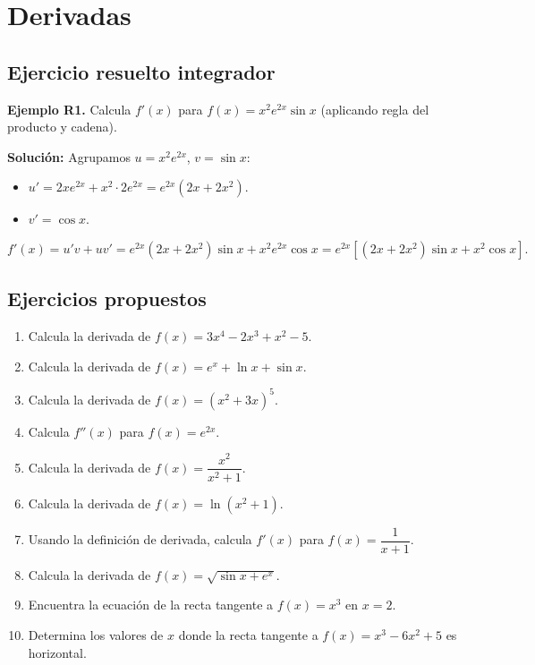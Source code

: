 \documentclass[12pt, a4paper]{article}
\begin{document}
\newpage

\section{Derivadas}

\subsection{Ejercicio resuelto integrador}

\textbf{Ejemplo R1.} Calcula $f'(x)$ para $f(x) = x^2 e^{2x} \sin x$ (aplicando regla del producto y cadena).

\begin{cuadrosolucion}
  \textbf{Solución:} Agrupamos $u = x^2 e^{2x}$, $v = \sin x$:
  \begin{itemize}
    \item $u' = 2x e^{2x} + x^2 \cdot 2e^{2x} = e^{2x}(2x + 2x^2)$.
    \item $v' = \cos x$.
  \end{itemize}
  $$f'(x) = u'v + uv' = e^{2x}(2x + 2x^2)\sin x + x^2 e^{2x} \cos x = e^{2x}\left[(2x + 2x^2)\sin x + x^2 \cos x\right].$$
\end{cuadrosolucion}

\subsection{Ejercicios propuestos}

\begin{enumerate}[leftmargin=*, resume]
  \item \facil{} Calcula la derivada de $f(x) = 3x^4 - 2x^3 + x^2 - 5$.

  \item \facil{} Calcula la derivada de $f(x) = e^x + \ln x + \sin x$.

  \item \facil{} Calcula la derivada de $f(x) = (x^2 + 3x)^5$.

  \item \facil{} Calcula $f''(x)$ para $f(x) = e^{2x}$.

  \item \medio{} Calcula la derivada de $f(x) = \dfrac{x^2}{x^2 + 1}$.

  \item \medio{} Calcula la derivada de $f(x) = \ln(x^2 + 1)$.

  \item \medio{} Usando la definición de derivada, calcula $f'(x)$ para $f(x) = \dfrac{1}{x + 1}$.

  \item \dificil{} Calcula la derivada de $f(x) = \sqrt{\sin x + e^x}$.

  \item \dificil{} Encuentra la ecuación de la recta tangente a $f(x) = x^3$ en $x = 2$.

  \item \dificil{} Determina los valores de $x$ donde la recta tangente a $f(x) = x^3 - 6x^2 + 5$ es horizontal.
\end{enumerate}
\end{document}
